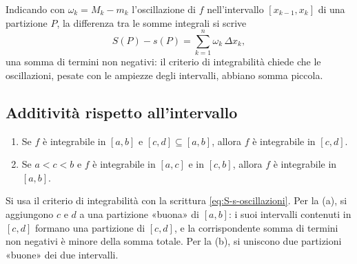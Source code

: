 Indicando con $\omega_{k}=M_{k}-m_{k}$ l'oscillazione di $f$ nell'intervallo
$[x_{k-1},x_{k}]$ di una partizione $P$, la differenza tra le somme integrali si scrive
\begin{equation}\label{eq:S-s-oscillazioni}
  S(P)-s(P)=\sum_{k=1}^{n}\omega_{k}\,\Delta x_{k} ,
\end{equation}
una somma di termini non negativi: il criterio di integrabilità chiede che le
oscillazioni, pesate con le ampiezze degli intervalli, abbiano somma piccola.

\subsection{Additività rispetto all'intervallo}

\begin{lemma}\label{lem:sottointervallo}
\begin{enumerate}[label=\textup{(\alph*)}]
  \item Se $f$ è integrabile in $[a,b]$ e $[c,d]\subseteq[a,b]$, allora $f$ è integrabile
  in $[c,d]$.
  \item Se $a<c<b$ e $f$ è integrabile in $[a,c]$ e in $[c,b]$, allora $f$ è integrabile
  in $[a,b]$.
\end{enumerate}
\end{lemma}

\begin{schema}
\end{schema}

\begin{strategia}
Si usa il criterio di integrabilità con la scrittura \eqref{eq:S-s-oscillazioni}. Per la
(a), si aggiungono $c$ e $d$ a una partizione «buona» di $[a,b]$: i suoi intervalli
contenuti in $[c,d]$ formano una partizione di $[c,d]$, e la corrispondente somma di
termini non negativi è minore della somma totale. Per la (b), si uniscono due
partizioni «buone» dei due intervalli.
\end{strategia}

